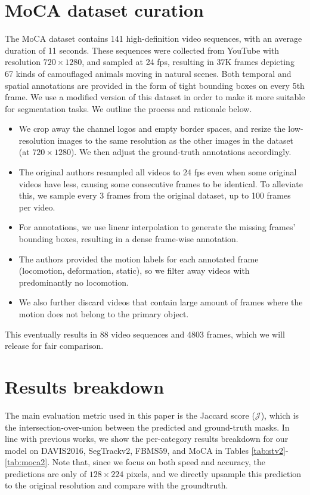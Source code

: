 \section{MoCA dataset curation}
The MoCA dataset
contains 141 high-definition video sequences, 
with an average duration of 11 seconds. These sequences were collected from YouTube with resolution $720 \times 1280$, and sampled at 24 fps, resulting in $37$K frames
depicting 67 kinds of camouflaged animals moving in natural scenes. 
Both temporal and spatial annotations are provided in the form of tight bounding boxes on every 5th frame. We use a modified version of this dataset in order to make it more suitable for segmentation tasks. 
We outline the process and rationale below.
\begin{itemize}
    \vspace{-0.2cm}\item We crop away the channel logos and empty border spaces, and resize the low-resolution images to the same resolution as the other images in the dataset (at $720 \times 1280$).
    We then adjust the ground-truth annotations accordingly.
    \vspace{-0.2cm}\item The original authors resampled all videos to 24 fps even when some original videos have less, causing some consecutive frames to be identical. To alleviate this, we sample every 3 frames from the original dataset, up to 100 frames per video. 
    \vspace{-0.2cm}\item For annotations, we use linear interpolation to generate the missing frames' bounding boxes, 
    resulting in a dense frame-wise annotation. 
    \vspace{-0.2cm}\item The authors provided the motion labels for each annotated frame (locomotion, deformation, static), so we filter away videos with predominantly no locomotion. 
    \vspace{-0.2cm}\item We also further discard videos that contain large amount of frames where the motion does not belong to the primary object. 
\end{itemize}
This eventually results in 88 video sequences and 4803 frames, 
which we will release for fair comparison. \\[-10pt]


\section{Results breakdown}
The main evaluation metric used in this paper is the Jaccard score ($\mathcal{J}$), which is the intersection-over-union between the predicted and ground-truth masks.
In line with previous works, 
we show the per-category results breakdown for our model on DAVIS2016, SegTrackv2, FBMS59, and MoCA in Tables \ref{tab:stv2}-\ref{tab:moca2}.
Note that, since we focus on both speed and accuracy,
the predictions are only of $128 \times 224$ pixels, 
and we directly upsample this prediction to the original resolution and compare with the groundtruth. 
